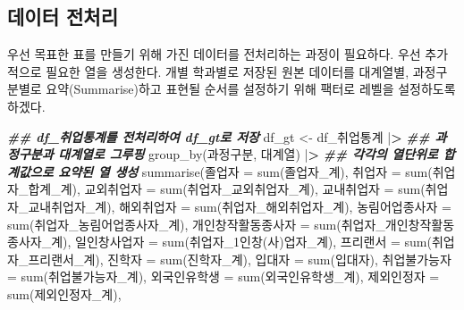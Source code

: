 \documentclass[
]{article}
\newenvironment{Shaded}{\begin{snugshade}}{\end{snugshade}}
\newcommand{\AttributeTok}[1]{\textcolor[rgb]{0.77,0.63,0.00}{#1}}
\newcommand{\DocumentationTok}[1]{\textcolor[rgb]{0.56,0.35,0.01}{\textbf{\textit{#1}}}}
\newcommand{\ErrorTok}[1]{\textcolor[rgb]{0.64,0.00,0.00}{\textbf{#1}}}
\newcommand{\FunctionTok}[1]{\textcolor[rgb]{0.00,0.00,0.00}{#1}}
\newcommand{\NormalTok}[1]{#1}
\newcommand{\OtherTok}[1]{\textcolor[rgb]{0.56,0.35,0.01}{#1}}
\newcommand{\SpecialCharTok}[1]{\textcolor[rgb]{0.00,0.00,0.00}{#1}}
\newcommand{\StringTok}[1]{\textcolor[rgb]{0.31,0.60,0.02}{#1}}
\begin{document}
\hypertarget{uxb370uxc774uxd130-uxc804uxcc98uxb9ac}{%
\subsection{데이터 전처리}\label{uxb370uxc774uxd130-uxc804uxcc98uxb9ac}}

우선 목표한 표를 만들기 위해 가진 데이터를 전처리하는 과정이 필요하다.
우선 추가적으로 필요한 열을 생성한다. 개별 학과별로 저장된 원본 데이터를
대계열별, 과정구분별로 요약(Summarise)하고 표현될 순서를 설정하기 위해
팩터로 레벨을 설정하도록 하겠다.

\begin{Shaded}
\begin{Highlighting}[]
\DocumentationTok{\#\# df\_취업통계를 전처리하여 df\_gt로 저장}
\NormalTok{df\_gt }\OtherTok{\textless{}{-}}\NormalTok{ df\_취업통계 }\SpecialCharTok{|}\ErrorTok{\textgreater{}}
  \DocumentationTok{\#\# 과정구분과 대계열로 그루핑}
  \FunctionTok{group\_by}\NormalTok{(과정구분, 대계열) }\SpecialCharTok{|}\ErrorTok{\textgreater{}}
  \DocumentationTok{\#\# 각각의 열단위로 합계값으로 요약된 열 생성 }
  \FunctionTok{summarise}\NormalTok{(졸업자 }\OtherTok{=} \FunctionTok{sum}\NormalTok{(졸업자\_계), }
\NormalTok{            취업자 }\OtherTok{=} \FunctionTok{sum}\NormalTok{(취업자\_합계\_계), }
\NormalTok{            교외취업자 }\OtherTok{=} \FunctionTok{sum}\NormalTok{(취업자\_교외취업자\_계), }
\NormalTok{            교내취업자 }\OtherTok{=} \FunctionTok{sum}\NormalTok{(취업자\_교내취업자\_계), }
\NormalTok{            해외취업자 }\OtherTok{=} \FunctionTok{sum}\NormalTok{(취업자\_해외취업자\_계), }
\NormalTok{            농림어업종사자 }\OtherTok{=} \FunctionTok{sum}\NormalTok{(취업자\_농림어업종사자\_계), }
\NormalTok{            개인창작활동종사자 }\OtherTok{=} \FunctionTok{sum}\NormalTok{(취업자\_개인창작활동종사자\_계), }
\NormalTok{            일인창사업자 }\OtherTok{=} \FunctionTok{sum}\NormalTok{(}\StringTok{\textasciigrave{}}\AttributeTok{취업자\_1인창(사)업자\_계}\StringTok{\textasciigrave{}}\NormalTok{), }
\NormalTok{            프리랜서 }\OtherTok{=} \FunctionTok{sum}\NormalTok{(취업자\_프리랜서\_계), }
\NormalTok{            진학자 }\OtherTok{=} \FunctionTok{sum}\NormalTok{(진학자\_계), }
\NormalTok{            입대자 }\OtherTok{=} \FunctionTok{sum}\NormalTok{(입대자),}
\NormalTok{            취업불가능자 }\OtherTok{=} \FunctionTok{sum}\NormalTok{(취업불가능자\_계), }
\NormalTok{            외국인유학생 }\OtherTok{=} \FunctionTok{sum}\NormalTok{(외국인유학생\_계), }
\NormalTok{            제외인정자 }\OtherTok{=} \FunctionTok{sum}\NormalTok{(제외인정자\_계), }

\end{Highlighting}
\end{Shaded}
\end{document}
